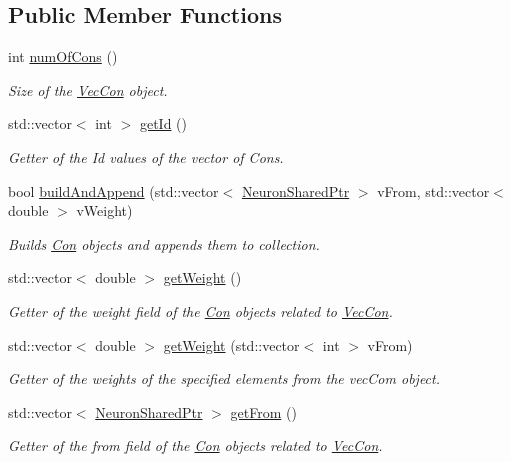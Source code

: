 \subsection*{Public Member Functions}
\begin{DoxyCompactItemize}
\item 
int \hyperlink{classvec_con_a1e39a5e78c40ae8af9bbd2fd7f0dc749}{numOfCons} ()
\begin{DoxyCompactList}\small\item\em Size of the \hyperlink{classvec_con}{VecCon} object. \end{DoxyCompactList}\item 
std::vector$<$ int $>$ \hyperlink{classvec_con_aa9f3f5df4c4060951c975c4c829b8471}{getId} ()
\begin{DoxyCompactList}\small\item\em Getter of the Id values of the vector of Cons. \end{DoxyCompactList}\item 
bool \hyperlink{classvec_con_ae2f2979a6ce42fa5ff0a8911a3ec3cb6}{buildAndAppend} (std::vector$<$ \hyperlink{_a_m_o_r_e_8h_a03051950b0faf9499d14cf376e04c329}{NeuronSharedPtr} $>$ vFrom, std::vector$<$ double $>$ vWeight)
\begin{DoxyCompactList}\small\item\em Builds \hyperlink{class_con}{Con} objects and appends them to collection. \end{DoxyCompactList}\item 
std::vector$<$ double $>$ \hyperlink{classvec_con_a76f10669494f2247d036ae6a1f296873}{getWeight} ()
\begin{DoxyCompactList}\small\item\em Getter of the weight field of the \hyperlink{class_con}{Con} objects related to \hyperlink{classvec_con}{VecCon}. \end{DoxyCompactList}\item 
std::vector$<$ double $>$ \hyperlink{classvec_con_ac3d4b7b11bfff3407afd585c1ae6a658}{getWeight} (std::vector$<$ int $>$ vFrom)
\begin{DoxyCompactList}\small\item\em Getter of the weights of the specified elements from the vecCom object. \end{DoxyCompactList}\item 
std::vector$<$ \hyperlink{_a_m_o_r_e_8h_a03051950b0faf9499d14cf376e04c329}{NeuronSharedPtr} $>$ \hyperlink{classvec_con_ae72d00aedcd054e690f1dcf2ca5ac2c2}{getFrom} ()
\begin{DoxyCompactList}\small\item\em Getter of the from field of the \hyperlink{class_con}{Con} objects related to \hyperlink{classvec_con}{VecCon}. \end{DoxyCompactList}\item 

\end{DoxyCompactItemize}
